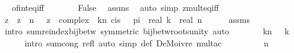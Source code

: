 \begin{isabellebody}
\ \isamarkupfalse%
\ of{\isacharunderscore}{\kern0pt}int{\isacharunderscore}{\kern0pt}eq{\isacharunderscore}{\kern0pt}iff\isanewline
\ \ \ \ \isamarkupfalse%
\ \isamarkupfalse%
\ False\ \isamarkupfalse%
\ assms\ \isamarkupfalse%
\ {\isacharparenleft}{\kern0pt}auto\ simp{\isacharcolon}{\kern0pt}\ zmult{\isacharunderscore}{\kern0pt}eq{\isacharunderscore}{\kern0pt}{}{\isacharunderscore}{\kern0pt}iff{\isacharparenright}{\kern0pt}\isanewline
\ \ \isamarkupfalse%
\isanewline
\isanewline
\ \ \isamarkupfalse%
\ {\isachardoublequoteopen}{\isacharparenleft}{\kern0pt}{\isasymSum}z\ {\isacharbar}{\kern0pt}\ z\ {\isacharcircum}{\kern0pt}\ n\ {\isacharequal}{\kern0pt}\ {}{\isachardot}{\kern0pt}\ z\ {\isacharcolon}{\kern0pt}{\isacharcolon}{\kern0pt}\ complex{\isacharparenright}{\kern0pt}\ {\isacharequal}{\kern0pt}\ {\isacharparenleft}{\kern0pt}{\isasymSum}k{\isacharless}{\kern0pt}n{\isachardot}{\kern0pt}\ cis\ {\isacharparenleft}{\kern0pt}{}\ {\isacharasterisk}{\kern0pt}\ pi\ {\isacharasterisk}{\kern0pt}\ real\ k\ {\isacharslash}{\kern0pt}\ real\ n{\isacharparenright}{\kern0pt}{\isacharparenright}{\kern0pt}{\isachardoublequoteclose}\isanewline
\ \ \ \ \isamarkupfalse%
\ assms\ \isamarkupfalse%
\ {\isacharparenleft}{\kern0pt}intro\ sum{\isachardot}{\kern0pt}reindex{\isacharunderscore}{\kern0pt}bij{\isacharunderscore}{\kern0pt}betw\ {\isacharbrackleft}{\kern0pt}symmetric{\isacharbrackright}{\kern0pt}\ bij{\isacharunderscore}{\kern0pt}betw{\isacharunderscore}{\kern0pt}roots{\isacharunderscore}{\kern0pt}unity{\isacharparenright}{\kern0pt}\ auto\isanewline
\ \ \isamarkupfalse%
\ \isamarkupfalse%
\ {\isachardoublequoteopen}{\isasymdots}\ {\isacharequal}{\kern0pt}\ {\isacharparenleft}{\kern0pt}{\isasymSum}k{\isacharless}{\kern0pt}n{\isachardot}{\kern0pt}\ {\isasymomega}\ {\isacharcircum}{\kern0pt}\ k{\isacharparenright}{\kern0pt}{\isachardoublequoteclose}\isanewline
\ \ \ \ \isamarkupfalse%
\ {\isacharparenleft}{\kern0pt}intro\ sum{\isachardot}{\kern0pt}cong\ refl{\isacharparenright}{\kern0pt}\ {\isacharparenleft}{\kern0pt}auto\ simp{\isacharcolon}{\kern0pt}\ {\isasymomega}{\isacharunderscore}{\kern0pt}def\ DeMoivre\ mult{\isacharunderscore}{\kern0pt}ac{\isacharparenright}{\kern0pt}\isanewline
\ \ \isamarkupfalse%
\ \isamarkupfalse%
\ {\isachardoublequoteopen}{\isasymdots}\ {\isacharequal}{\kern0pt}\ {\isacharparenleft}{\kern0pt}{\isasymomega}\ {\isacharcircum}{\kern0pt}\ n\ {\isacharminus}{\kern0pt}\ {}{\isacharparenright}{\kern0pt}\ {\isacharslash}{\kern0pt}\ {\isacharparenleft}{\kern0pt}{\isasymomega}\ {\isacharminus}{\kern0pt}\ {}{\isacharparenright}{\kern0pt}{\isachardoublequoteclose}\isanewline

\end{isabellebody}
